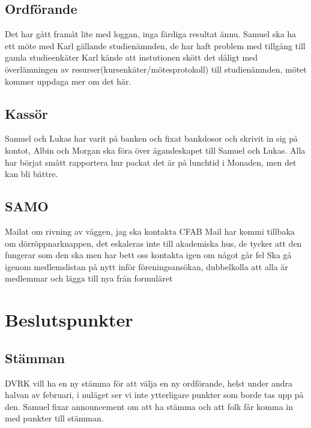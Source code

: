 \documentclass[protokoll]{dvd}
\begin{document}

\subsection{Ordförande}
Det har gått framåt lite med loggan, inga färdiga resultat ännu.
Samuel ska ha ett möte med Karl gällande studienämnden, de har haft problem med tillgång till gamla studieenkäter 
Karl kände att instutionen skött det dåligt med överlämningen av resurser(kursenkäter/mötesprotokoll) 
till studienämnden, mötet kommer uppdaga mer om det här. 

\subsection{Kassör}
Samuel och Lukas har varit på banken och fixat bankdosor och skrivit in sig på kontot, 
Albin och Morgan ska föra över ägandeskapet till Samuel och Lukas.
Alla har börjat smått rapportera hur packat det är på lunchtid i Monaden, men det kan bli bättre.


\subsection{SAMO}
Mailat om rivning av väggen, jag ska kontakta CFAB
Mail har kommi tillbaka om dörröppnarknappen, det eskaleras inte till akademiska hus, de tycker att den fungerar som den ska men har bett oss kontakta igen om något går fel 
Ska gå igenom medlemslistan på nytt inför föreningsansökan, dubbelkolla att alla är medlemmar och lägga till nya från formuläret 

\section{Beslutspunkter}


\subsection{Stämman}
DVRK vill ha en ny stämma för att välja en ny ordförande, helst under andra halvan av februari,
i nuläget ser vi inte ytterligare punkter som borde tas upp på den.
Samuel fixar announcement om att ha stämma och att folk får komma in med punkter till stämman.
\end{document}
